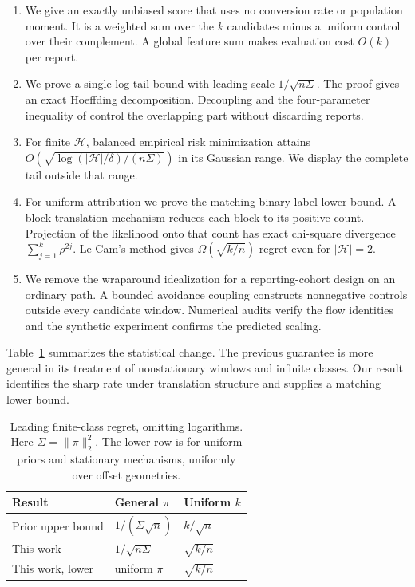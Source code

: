 \documentclass[twoside]{article}
\newcommand{\1}{\mathbf 1}
\newcommand{\cH}{\mathcal H}
\begin{document}
\begin{enumerate}[leftmargin=*,itemsep=2pt,topsep=3pt]
\item We give an exactly unbiased score that uses no conversion rate or population moment. It is a weighted sum over the $k$ candidates minus a uniform control over their complement. A global feature sum makes evaluation cost $O(k)$ per report.
\item We prove a single-log tail bound with leading scale $1/\sqrt{n\Sigma}$. The proof gives an exact Hoeffding decomposition. Decoupling and the four-parameter inequality of \citet{gine2000exponential} control the overlapping part without discarding reports.
\item For finite $\cH$, balanced empirical risk minimization attains $O(\sqrt{\log(|\cH|/\delta)/(n\Sigma)})$ in its Gaussian range. We display the complete tail outside that range.
\item For uniform attribution we prove the matching binary-label lower bound. A block-translation mechanism reduces each block to its positive count. Projection of the likelihood onto that count has exact chi-square divergence $\sum_{j=1}^k \rho^{2j}$. Le Cam's method gives $\Omega(\sqrt{k/n})$ regret even for $|\cH|=2$.
\item We remove the wraparound idealization for a reporting-cohort design on an ordinary path. A bounded avoidance coupling constructs nonnegative controls outside every candidate window. Numerical audits verify the flow identities and the synthetic experiment confirms the predicted scaling.
\end{enumerate}

Table~\ref{tab:comparison} summarizes the statistical change. The previous guarantee is more general in its treatment of nonstationary windows and infinite classes. Our result identifies the sharp rate under translation structure and supplies a matching lower bound.

\begin{table}[t]
\centering
\small
\caption{Leading finite-class regret, omitting logarithms. Here $\Sigma=\|\pi\|_2^2$. The lower row is for uniform priors and stationary mechanisms, uniformly over offset geometries.}
\label{tab:comparison}
\begin{tabular}{@{}lll@{}}
\toprule
Result & General $\pi$ & Uniform $k$ \\
\midrule
Prior upper bound & $1/(\Sigma\sqrt n)$ & $k/\sqrt n$ \\
This work & $1/\sqrt{n\Sigma}$ & $\sqrt{k/n}$ \\
This work, lower & uniform $\pi$ & $\sqrt{k/n}$ \\
\bottomrule
\end{tabular}
\end{table}
\end{document}
